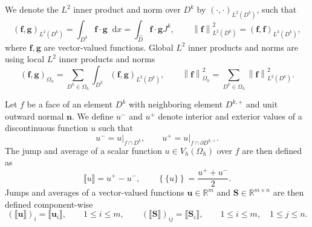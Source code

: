 \documentclass{siamart0216}
\newcommand{\nor}[1]{\left\| #1 \right\|}
\newcommand{\LRp}[1]{\left( #1 \right)}
\newcommand{\LRc}[1]{\left\{ #1 \right\}}
\newcommand{\LRl}[1]{\left. #1 \right|}
\newcommand{\jump}[1] {\ensuremath{\llbracket#1\rrbracket}}
\newcommand{\avg}[1] {\ensuremath{\LRc{\!\{#1\}\!}}}
\renewcommand{\Oh}{{\Omega_h}}
\newcommand{\Lk}{L^2\LRp{D^k}}
\newcommand*\diff[1]{\mathop{}\!{\mathrm{d}#1}}
\begin{document}
We denote the $L^2$ inner product and norm over $D^k$ by $\LRp{\cdot,\cdot}_{L^2\LRp{D^k}}$, such that
\[
\LRp{\bm{f},\bm{g}}_{\Lk} = \int_{D^k} \bm{f}\cdot\bm{g} \diff x = \int_{\widehat{D}} \bm{f}\cdot\bm{g} J^k, \qquad \nor{\bm{f}}_{\Lk}^2 = \LRp{\bm{f},\bm{f}}_{\Lk},
\]
where $\bm{f},\bm{g}$ are vector-valued functions.  Global $L^2$ inner products and norms are using local $L^2$ inner products and norms
\[
\LRp{\bm{f},\bm{g}}_{\Oh} = \sum_{D^k\in \Oh} \int_{D^k} \LRp{\bm{f},\bm{g}}_{\Lk}, \qquad \nor{\bm{f}}_{\Oh}^2 = \sum_{D^k\in \Oh} \nor{\bm{f}}^2_{\Lk}.
\]

Let $f$ be a face of an element $D^{k}$ with neighboring element $D^{k,+}$ and unit outward normal $\bm{n}$.  We define $u^-$ and $u^+$ denote interior and exterior values of a discontinuous function $u$ such that
\[
{u}^- = \LRl{u}_{f \cap D^k}, \qquad {u}^+ = \LRl{u}_{f \cap  \partial D^{k,+}}.  
\]
The jump and average of a scalar function $u\in V_h\LRp{\Omega_h}$ over $f$ are then defined as
\[
\jump{u} = u^+ - u^-, \qquad \avg{u} = \frac{u^+ + u^-}{2}.
\]
Jumps and averages of a vector-valued functions $\bm{u}\in \mathbb{R}^m$ and $\bm{S}\in \mathbb{R}^{m\times n}$ are then defined component-wise 
\[
\LRp{\jump{\bm{u}}}_i = \jump{\bm{u}_i}, \qquad 1\leq i \leq m, \qquad \LRp{\jump{\bm{S}}}_{ij} = \jump{\bm{S}_i}, \qquad 1\leq i \leq m, \quad 1\leq j \leq n.
\]
\end{document}
